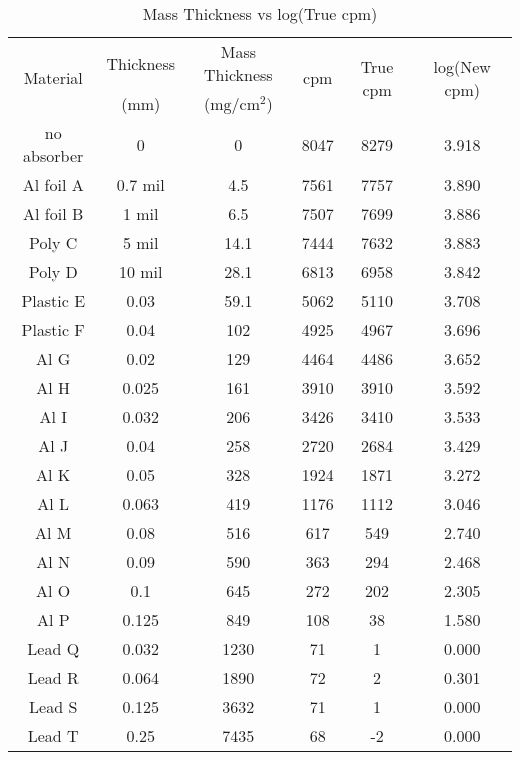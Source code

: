 \documentclass[11pt]{article}
\begin{document}
	\begin{table}[htbp]
		\centering
		\caption{Mass Thickness vs log(True cpm)}
		\begin{tabular}{cccccc}
			\toprule
			\multirow{2}[4]{*}{Material} & Thickness & Mass Thickness & \multirow{2}[4]{*}{cpm} & \multirow{2}[4]{*}{True cpm} & \multirow{2}[4]{*}{log(New cpm)} \\
			\cmidrule{2-3}      & ($\unit{\milli\meter}$) & ($\unit{\milli\gram\per\centi\meter\squared}$) &   &   &  \\
			\midrule
			no absorber & 0 & 0 & 8047 & 8279 & 3.918 \\
			Al foil A & 0.7 mil & 4.5 & 7561 & 7757 & 3.890 \\
			Al foil B & 1 mil & 6.5 & 7507 & 7699 & 3.886 \\
			Poly C & 5 mil & 14.1 & 7444 & 7632 & 3.883 \\
			Poly D & 10 mil & 28.1 & 6813 & 6958 & 3.842 \\
			Plastic E & 0.03 & 59.1 & 5062 & 5110 & 3.708 \\
			Plastic F & 0.04 & 102 & 4925 & 4967 & 3.696 \\
			Al G & 0.02 & 129 & 4464 & 4486 & 3.652 \\
			Al H & 0.025 & 161 & 3910 & 3910 & 3.592 \\
			Al I & 0.032 & 206 & 3426 & 3410 & 3.533 \\
			Al J & 0.04 & 258 & 2720 & 2684 & 3.429 \\
			Al K & 0.05 & 328 & 1924 & 1871 & 3.272 \\
			Al L & 0.063 & 419 & 1176 & 1112 & 3.046 \\
			Al M & 0.08 & 516 & 617 & 549 & 2.740 \\
			Al N & 0.09 & 590 & 363 & 294 & 2.468 \\
			Al O & 0.1 & 645 & 272 & 202 & 2.305 \\
			Al P & 0.125 & 849 & 108 & 38 & 1.580 \\
			Lead Q & 0.032 & 1230 & 71 & 1 & 0.000 \\
			Lead R & 0.064 & 1890 & 72 & 2 & 0.301 \\
			Lead S & 0.125 & 3632 & 71 & 1 & 0.000 \\
			Lead T & 0.25 & 7435 & 68 & -2 & 0.000 \\
			\bottomrule
		\end{tabular}%
		\label{tab:11_Table}%
	\end{table}%
	
\end{document}
